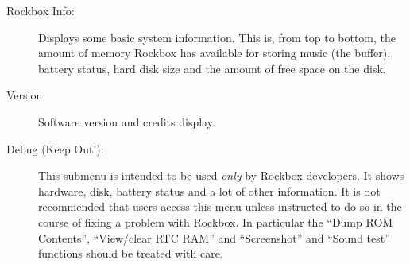 \begin{description}
\item[Rockbox Info:]
  Displays some basic system information.  This is, from top to bottom, 
the amount of memory Rockbox has available for storing music (the buffer),
 battery status, hard disk size and the amount of free space on the disk.
  
\item[Version:]
  Software version and credits display.
  
\item[Debug (Keep Out!):]
  This submenu is intended to be used \emph{only} by Rockbox developers. 
  It shows hardware, disk, battery status and a lot of other information.  
  It is not recommended that users access this menu unless instructed to do 
  so in the course of fixing a problem with Rockbox.  In particular the 
  ``Dump ROM Contents'', ``View/clear RTC RAM'' and ``Screenshot'' and 
  ``Sound test'' functions should be treated with care.
\end{description}


